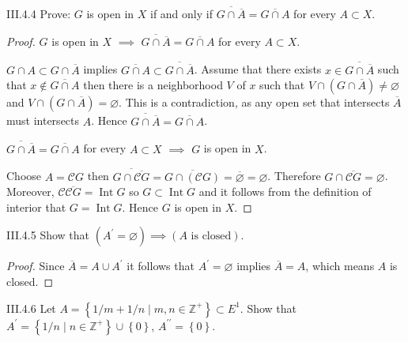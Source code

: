 \begin{problem}{III.4.4}
Prove: \(G\) is open in \(X\) if and only if \( \overline{G \cap \overline{A}} = \overline{G \cap A} \) for every \( A \subset X \).
\end{problem}

\begin{proof}
	\( G \) is open in \(X\) \( \implies \) \( \overline{G \cap \overline{A}} = \overline{G \cap A} \) for every \( A \subset X \).

	\( G \cap A \subset G \cap \overline{A} \) implies \( \overline{G \cap A} \subset \overline{G \cap \overline{A}} \). Assume that there exists \( x \in \overline{G \cap \overline{A}} \) such that \( x \notin \overline{G \cap A} \) then there is a neighborhood \(V\) of \(x\) such that \( V \cap (G \cap \overline{A}) \ne \varnothing \) and \( V \cap (G \cap \overline{A}) = \varnothing \). This is a contradiction, as any open set that intersects \( \overline{A} \) must intersects \( A \). Hence \( \overline{G \cap \overline{A}} = \overline{G \cap A} \).

	\( \overline{G \cap \overline{A}} = \overline{G \cap A} \) for every \( A \subset X \) \( \implies \)  \( G \) is open in \(X\).

	Choose \( A = \mathscr{C}G \) then \( \overline{G \cap \overline{\mathscr{C}G}} = \overline{G \cap (\mathscr{C}G)} = \overline{\varnothing} = \varnothing \). Therefore \( G \cap \overline{\mathscr{C}G} = \varnothing \). Moreover, \( \mathscr{C}\overline{\mathscr{C}G} = \operatorname{Int} G \) so \( G \subset \operatorname{Int} G \) and it follows from the definition of interior that \( G = \operatorname{Int} G \). Hence \( G \) is open in \( X \).
\end{proof}

\begin{problem}{III.4.5}
Show that \( (A^{\prime} = \varnothing) \implies (A \text{ is closed}) \).
\end{problem}

\begin{proof}
	Since \( \overline{A} = A \cup A^{\prime} \) it follows that \( A^{\prime} = \varnothing \) implies \( \overline{A} = A \), which means \( A \) is closed.
\end{proof}

\begin{problem}{III.4.6}
Let \(A = \left\{ 1/m + 1/n \mid m, n \in \mathbb{Z}^{+} \right\} \subset E^{1} \). Show that \( A^{\prime} = \left\{ 1/n \mid n \in \mathbb{Z}^{+} \right\} \cup \left\{ 0 \right\} \), \( A^{\prime\prime} = \left\{0\right\} \).
\end{problem}

